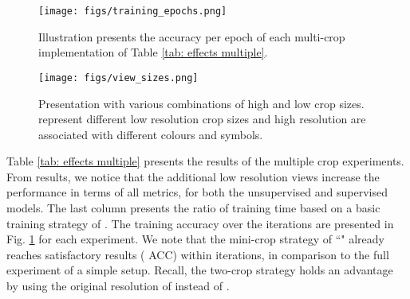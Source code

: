 \documentclass[journal]{IEEEtran}
\begin{document}
\begin{table}[t]
\caption{Effectiveness of Multiple Crops Strategies}
\label{tab: effects multiple}
\end{table}


\begin{figure}[t]
    \centering
    \texttt{[image: figs/training\_epochs.png]}
    \caption{Illustration presents the accuracy per epoch of each multi-crop implementation of Table \ref{tab: effects multiple}.
    }
   \label{fig:training epochs}
\end{figure}


\begin{figure}[t]
    \centering
    \texttt{[image: figs/view\_sizes.png]}
    \caption{Presentation with various combinations of high and low crop sizes.  represent different low resolution crop sizes and high resolution are associated with different colours and symbols. 
    }
   \label{fig:views resolution}
\end{figure}

Table \ref{tab: effects multiple} presents the results of the multiple crop experiments. From results, we notice that the additional low resolution views increase the performance in terms of all metrics, for both the unsupervised and supervised models. The last column presents the ratio of training time based on a basic training strategy of . The training accuracy over the iterations are presented in Fig. \ref{fig:training epochs} for each experiment. We note that the mini-crop strategy of ``" already reaches satisfactory results ( ACC) within  iterations, in comparison to the full experiment of a simple setup. Recall, the two-crop strategy holds an advantage by using the original resolution of  instead of .\par
\end{document}
